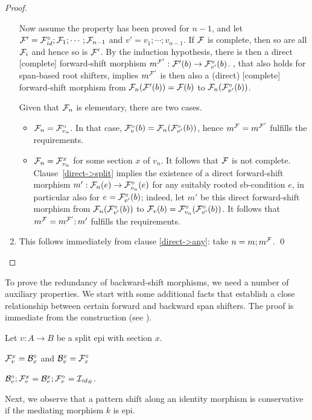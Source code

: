\begin{proof}
\begin{enumerate}[topsep=\smallskipamount]
\smallskip Now assume the property has been proved for $n-1$, and let $\cF'=\dF\id;\cF_1;\cdots;\cF_{n-1}$ and $v'=v_1;\cdots;v_{n-1}$. If $\cF$ is complete, then so are all $\cF_i$ and hence so is $\cF'$. By the induction hypothesis, there is then a direct [complete] forward-shift morphism $m^{\cF'}:\cF'(b) \to \dF{v'}(b)$. , that also holds for span-based root shifters, implies $m^{\cF'}$ is then also a (direct) [complete] forward-shift morphism from $\cF_n(\cF'(b))=\cF(b)$ to $\cF_n(\dF{v'}(b))$.

\smallskip
Given that $\cF_n$ is elementary, there are two cases.
\begin{itemize}
\item $\cF_n=\dF{v_n}$. In that case, $\dF v(b)=\cF_n(\dF{v'}(b))$, hence $m^\cF=m^{\cF'}$ fulfills the requirements.
\item $\cF_n=\rF{v_n}x$ for some section $x$ of $v_n$. It follows that $\cF$ is not complete. Clause~\ref{direct->split} implies the existence of a direct forward-shift morphism $m':\cF_n(e)\to \dF{v_n}(e)$ for any suitably rooted sb-condition $e$, in particular also for $e=\dF{v'}(b)$; indeed, let $m'$ be this direct forward-shift morphism from $\cF_n(\dF{v'}(b))$ to $\cF_v(b)=\dF{v_n}(\dF{v'}(b))$. It follows that $m^\cF=m^{\cF'};m'$ fulfills the requirements.  
\end{itemize}

\item This follows immediately from clause \ref{direct->any}: take $n=m;m^\cF$.
\qed
\end{enumerate}
\end{proof}
%
To prove the redundancy of backward-shift morphisms, we need a number of auxiliary properties. We start with some additional facts that establish a close relationship between certain forward and backward span shifters. The proof is immediate from the construction (see ).

\begin{lemma}
Let $v:A\to B$ be a split epi with section $x$.
\begin{enumerateS}
\item $\rF v x=\dB x$ and $\rB v x=\dF x$
\item $\dB v;\rF v x=\rB v x;\dF v=\cI_{\id_B}$.
\end{enumerateS}
\end{lemma}
%
Next, we observe that a pattern shift along an identity morphism is conservative if the mediating morphism $k$ is epi.

